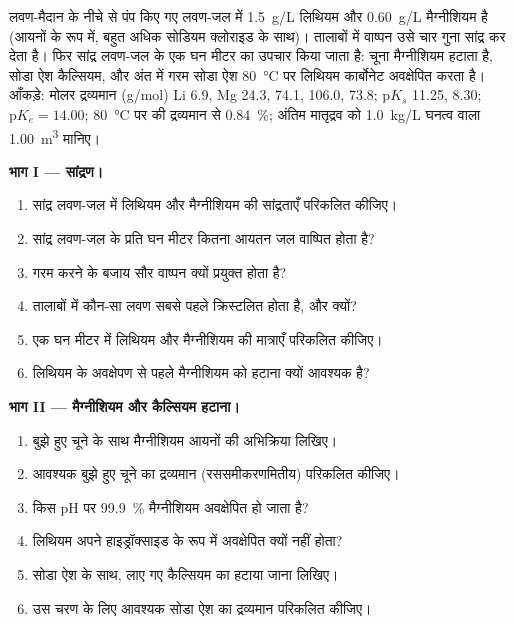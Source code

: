 \begin{problem}
\label{pb:b1:s-block:1}
लवण-मैदान के नीचे से पंप किए गए लवण-जल में \qty{1.5}{g/L} लिथियम
और \qty{0.60}{g/L} मैग्नीशियम है (आयनों के रूप में, बहुत अधिक सोडियम क्लोराइड के साथ)।
तालाबों में वाष्पन उसे चार गुना सांद्र कर देता है। फिर सांद्र लवण-जल के
एक घन मीटर का उपचार किया जाता है: चूना मैग्नीशियम हटाता है, सोडा ऐश
कैल्सियम, और अंत में गरम सोडा ऐश \qty{80}{\celsius} पर लिथियम कार्बोनेट अवक्षेपित करता है।
आँकड़े: मोलर द्रव्यमान (\unit{g/mol}) Li 6.9, Mg 24.3,
 74.1,  106.0,  73.8; $\mathrm{p}K_s$
 11.25,  8.30; $\mathrm{p}K_e = 14.00$; \qty{80}{\celsius} पर
 की  द्रव्यमान से \qty{0.84}{\percent}; अंतिम
मातृद्रव को \qty{1.0}{kg/L} घनत्व वाला \qty{1.00}{m^3} मानिए।

\medskip
\noindent\textbf{भाग I --- सांद्रण।}
\begin{enumerate}
  \item सांद्र लवण-जल में लिथियम और मैग्नीशियम की सांद्रताएँ
        परिकलित कीजिए।
  \item सांद्र लवण-जल के प्रति घन मीटर कितना आयतन जल
        वाष्पित होता है?
  \item गरम करने के बजाय सौर वाष्पन क्यों प्रयुक्त होता है?
  \item तालाबों में कौन-सा लवण सबसे पहले क्रिस्टलित होता है, और क्यों?
  \item एक घन मीटर में लिथियम और मैग्नीशियम की मात्राएँ परिकलित कीजिए।
  \item लिथियम के अवक्षेपण से पहले मैग्नीशियम को हटाना क्यों आवश्यक है?
\end{enumerate}

\medskip
\noindent\textbf{भाग II --- मैग्नीशियम और कैल्सियम हटाना।}
\begin{enumerate}[resume]
  \item बुझे हुए चूने के साथ मैग्नीशियम आयनों की अभिक्रिया लिखिए।
  \item आवश्यक बुझे हुए चूने का द्रव्यमान (रससमीकरणमितीय) परिकलित कीजिए।
  \item किस pH पर \qty{99.9}{\percent} मैग्नीशियम अवक्षेपित हो जाता है?
  \item लिथियम अपने हाइड्रॉक्साइड के रूप में अवक्षेपित क्यों नहीं होता?
  \item सोडा ऐश के साथ, लाए गए कैल्सियम का हटाया जाना लिखिए।
  \item उस चरण के लिए आवश्यक सोडा ऐश का द्रव्यमान परिकलित कीजिए।
\end{enumerate}


\end{problem}
